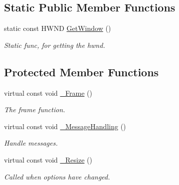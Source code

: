 \subsection*{Static Public Member Functions}
\begin{DoxyCompactItemize}
\item 
static const H\+W\+ND \hyperlink{class_ensum_1_1_core_1_1_win_window_a76fd8155e64f79c4a04f8dbe675f6da4}{Get\+Window} ()\hypertarget{class_ensum_1_1_core_1_1_win_window_a76fd8155e64f79c4a04f8dbe675f6da4}{}\label{class_ensum_1_1_core_1_1_win_window_a76fd8155e64f79c4a04f8dbe675f6da4}

\begin{DoxyCompactList}\small\item\em Static func, for getting the hwnd. \end{DoxyCompactList}\end{DoxyCompactItemize}
\subsection*{Protected Member Functions}
\begin{DoxyCompactItemize}
\item 
virtual const void \hyperlink{class_ensum_1_1_core_1_1_win_window_a309cbdef995b8ca8638fe297987ce852}{\+\_\+\+Frame} ()
\begin{DoxyCompactList}\small\item\em The frame function. \end{DoxyCompactList}\item 
virtual const void \hyperlink{class_ensum_1_1_core_1_1_win_window_a72c5ab4c337ca995b2d7c9a73864de70}{\+\_\+\+Message\+Handling} ()\hypertarget{class_ensum_1_1_core_1_1_win_window_a72c5ab4c337ca995b2d7c9a73864de70}{}\label{class_ensum_1_1_core_1_1_win_window_a72c5ab4c337ca995b2d7c9a73864de70}

\begin{DoxyCompactList}\small\item\em Handle messages. \end{DoxyCompactList}\item 
virtual const void \hyperlink{class_ensum_1_1_core_1_1_win_window_a6bda38d807b2afe273284c7c6836503f}{\+\_\+\+Resize} ()\hypertarget{class_ensum_1_1_core_1_1_win_window_a6bda38d807b2afe273284c7c6836503f}{}\label{class_ensum_1_1_core_1_1_win_window_a6bda38d807b2afe273284c7c6836503f}

\begin{DoxyCompactList}\small\item\em Called when options have changed. \end{DoxyCompactList}\end{DoxyCompactItemize}
